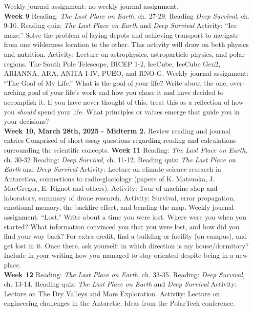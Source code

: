 \documentclass[10pt]{article}
\begin{document}
\begin{outline}[enumerate]
\2 Weekly journal assignment: no weekly journal assignment. \\
\1 \textbf{Week 9}
\2 Reading: \textit{The Last Place on Earth}, ch. 27-29.
\2 Reading \textit{Deep Survival}, ch. 9-10.
\2 Reading quiz: \textit{The Last Place on Earth} and \textit{Deep Survival}
\2 Activity: ``Ice maze.''  Solve the problem of laying depots and achieving transport to navigate from one wilderness location to the other.  This activity will draw on both physics and nutrition.
\2 Activity: Lecture on astrophysics, astroparticle physics, and polar regions.  The South Pole Telescope, BICEP 1-2, IceCube, IceCube Gen2, ARIANNA, ARA, ANITA I-IV, PUEO, and RNO-G.
\2 Weekly journal assignment: ``The Goal of My Life.'' What is the goal of your life?  Write about the one, over-arching goal of your life's work and how you chose it and have decided to accomplish it.  If you have never thought of this, treat this as a reflection of how you \textit{should} spend your life.  What principles or values emerge that guide you in your decisions? \\
\1 \textbf{Week 10, March 28th, 2025 - Midterm 2.}
\2 Review reading and journal entries
\2 Comprised of short essay questions regarding reading and calculations surrounding the scientific concepts.
\1 \textbf{Week 11}
\2 Reading: \textit{The Last Place on Earth}, ch. 30-32
\2 Reading: \textit{Deep Survival}, ch. 11-12.
\2 Reading quiz: \textit{The Last Place on Earth} and \textit{Deep Survival}
\2 Activity: Lecture on climate science research in Antarctica, connections to radio-glaciology (papers of K. Matsuoka, J. MacGregor, E. Rignot and others).
\2 Activity: Tour of machine shop and laboratory, summary of drone research.
\2 Activity: Survival, error propagation, emotional memory, the backfire effect, and bending the map.
\2 Weekly journal assignment: ``Lost.'' Write about a time you were lost.  Where were you when you started?  What information convinced you that you were lost, and how did you find your way back?  For extra credit, find a building or facility (on campus), and get lost in it.  Once there, ask yourself: in which direction is my house/dormitory?  Include in your writing how you managed to stay oriented despite being in a new place. \\
\1 \textbf{Week 12}
\2 Reading: \textit{The Last Place on Earth}, ch. 33-35.
\2 Reading: \textit{Deep Survival}, ch. 13-14.
\2 Reading quiz: \textit{The Last Place on Earth} and \textit{Deep Survival}
\2 Activity: Lecture on The Dry Valleys and Mars Exploration.
\2 Activity: Lecture on engineering challenges in the Antarctic.  Ideas from the PolarTech conference.

\end{outline}
\end{document}
